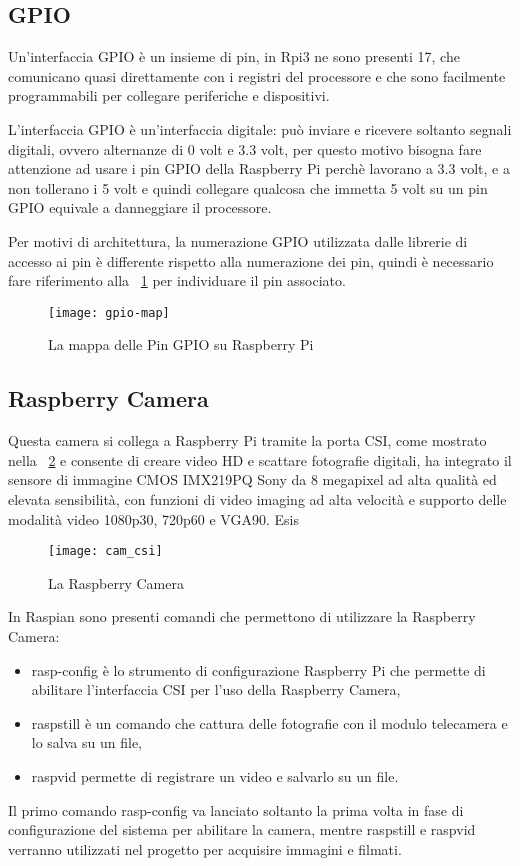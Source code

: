 \subsection{GPIO}
Un’interfaccia GPIO è un insieme di pin, in Rpi3 ne sono presenti 17, che comunicano quasi direttamente con i registri del processore e che sono facilmente programmabili per collegare periferiche e dispositivi.

L’interfaccia GPIO è un’interfaccia digitale: può inviare e ricevere soltanto segnali digitali, ovvero alternanze di 0 volt e 3.3 volt, per questo motivo bisogna fare attenzione ad usare i pin GPIO della Raspberry Pi perchè  lavorano a 3.3 volt, e a non tollerano i 5 volt e quindi collegare qualcosa che immetta 5 volt su un pin GPIO equivale a danneggiare il processore.

Per motivi di architettura, la numerazione GPIO utilizzata dalle librerie di accesso ai pin è differente rispetto alla numerazione dei pin, quindi è necessario fare riferimento alla \figurename~\ref{fig:gpio-map}
per individuare il pin associato.

 

\begin{figure}[htbp!] 
	\centering    
	\texttt{[image: gpio-map]}
	\caption[Mappa GPIO]{La mappa delle Pin GPIO su Raspberry Pi}
	\label{fig:gpio-map}
\end{figure}


\subsection{Raspberry Camera}
Questa camera si collega a Raspberry Pi tramite la porta CSI, come mostrato nella \figurename~\ref{fig:camera} e consente di creare video HD e scattare fotografie digitali, ha integrato il sensore di immagine CMOS IMX219PQ Sony da 8 megapixel ad alta qualità ed elevata sensibilità, con funzioni di video imaging ad alta velocità e supporto delle modalità video 1080p30, 720p60 e VGA90.
Esis
\begin{figure}[htbp!] 
	\centering    
	\texttt{[image: cam\_csi]}
	\caption[Raspberry Camera]{La Raspberry Camera}
	\label{fig:camera}
\end{figure}
In Raspian sono presenti comandi che permettono di utilizzare la Raspberry Camera:
\begin{itemize}
	\item rasp-config è lo strumento di configurazione  Raspberry Pi che permette di abilitare l'interfaccia CSI per l'uso della Raspberry Camera,
	\item raspstill è un comando che cattura delle fotografie con il modulo telecamera e lo salva su un file,
	\item raspvid permette di registrare un video e salvarlo su un file.
\end{itemize}
Il primo comando rasp-config va lanciato soltanto la prima volta in fase di configurazione del sistema per abilitare la camera, mentre raspstill e raspvid verranno utilizzati nel progetto per acquisire immagini e filmati.

